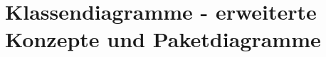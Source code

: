 \chapter{Klassendiagramme - erweiterte Konzepte und Paketdiagramme}



\newpage




\newpage


\newpage


